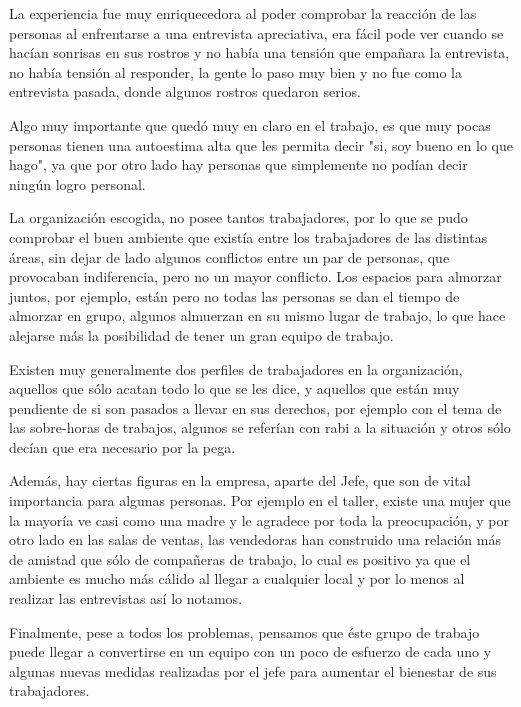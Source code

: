 
La experiencia fue muy enriquecedora al poder comprobar la reacción de las personas
al enfrentarse a una entrevista apreciativa, era fácil pode ver cuando se hacían sonrisas
en sus rostros y no había una tensión que empañara la entrevista, no había tensión al responder,
la gente lo paso muy bien y no fue como la entrevista pasada, donde algunos rostros quedaron
serios.

Algo muy importante que quedó muy en claro en el trabajo, es que muy pocas personas
tienen una autoestima alta que les permita decir "si, soy bueno en lo que hago",
ya que por otro lado hay personas que simplemente no podían decir ningún logro personal.

La organización escogida, no posee tantos trabajadores, por lo que se pudo comprobar el buen ambiente
que existía entre los trabajadores de las distintas áreas, sin dejar de lado algunos conflictos entre
un par de personas, que provocaban indiferencia, pero no un mayor conflicto.
Los espacios para almorzar juntos, por ejemplo, están pero no todas las personas se dan el tiempo
de almorzar en grupo, algunos almuerzan en su mismo lugar de trabajo, lo que hace alejarse más
la posibilidad de tener un gran equipo de trabajo.

Existen muy generalmente dos perfiles de trabajadores en la organización, aquellos que sólo acatan
todo lo que se les dice, y aquellos que están muy pendiente de si son pasados a llevar en sus
derechos, por ejemplo con el tema de las sobre-horas de trabajos, algunos se referían con rabi a la
situación y otros sólo decían que era necesario por la pega.

Además, hay ciertas figuras en la empresa, aparte del Jefe, que son de vital importancia para algunas
personas. Por ejemplo en el taller, existe una mujer que la mayoría ve casi como una madre y le
agradece por toda la preocupación, y por otro lado en las salas de ventas, las vendedoras han construido
una relación más de amistad que sólo de compañeras de trabajo, lo cual es positivo ya que el ambiente
es mucho más cálido al llegar a cualquier local y por lo menos al realizar las entrevistas así lo notamos.

Finalmente, pese a todos los problemas, pensamos que éste grupo de trabajo puede llegar a convertirse
en un equipo con un poco de esfuerzo de cada uno y algunas nuevas medidas realizadas por el jefe para
aumentar el bienestar de sus trabajadores.
